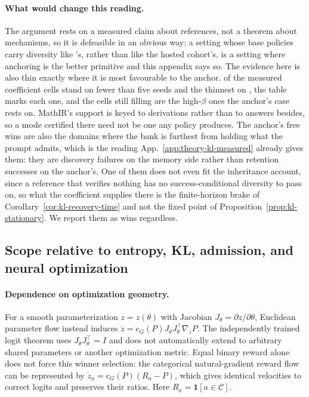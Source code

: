 \documentclass{article}
\newcommand{\1}{\mathbf 1}
\theoremstyle{remark}
\theoremstyle{definition}
\theoremstyle{plain}
\begin{document}
\paragraph{What would change this reading.}
The argument rests on a measured claim about references, not a theorem about
mechanisms, so it is defeasible in an obvious way: a setting whose base
policies carry diversity like \MDklWinDomain{}'s, rather than like the hosted
cohort's, is a setting where anchoring is the better primitive and this
appendix says so.
The evidence here is also thin exactly where it is most favourable to the
anchor. \MDklThinCells{} of the \MDklTotalCells{} measured coefficient cells
stand on fewer than five seeds and the thinnest on \MDklSeedsMin{}, the table
marks each one, and the cells still filling are the high-$\beta$ ones the
anchor's case rests on. MathIR's support is keyed to derivations rather than to
answers besides, so a mode certified there need not be one any policy produces.
The anchor's free wins are also the domains where the bank is furthest from
holding what the prompt admits, which is the reading
App.~\ref{app:theory-kl-measured} already gives them: they are discovery
failures on the memory side rather than retention successes on the anchor's.
One of them does not even fit the inheritance account, since a reference that
verifies nothing has no success-conditional diversity to pass on, so what the
coefficient supplies there is the finite-horizon brake of
Corollary~\ref{cor:kl-recovery-time} and not the fixed point of
Proposition~\ref{prop:kl-stationary}. We report them as wins regardless.

\subsection{Scope relative to entropy, KL, admission, and neural optimization}
\label{app:theory-entropy}
\label{app:theory-entropy-comparison}

\paragraph{Dependence on optimization geometry.}
For a smooth parameterization $z=z(\theta)$ with Jacobian
$J_\theta=\partial z/\partial\theta$, Euclidean parameter flow instead
induces $\dot z=c_G(P)J_\theta J_\theta^\top\nabla_zP$. The independently
trained logit theorem uses $J_\theta J_\theta^\top=I$ and does not automatically
extend to arbitrary shared parameters or another optimization metric. Equal
binary reward alone does not force this winner selection: the categorical
natural-gradient reward flow can be represented by
$\dot z_a=c_G(P)(R_a-P)$, which gives identical velocities to correct logits
and preserves their ratios. Here $R_a=\1[a\in\mathcal C]$.
\end{document}
